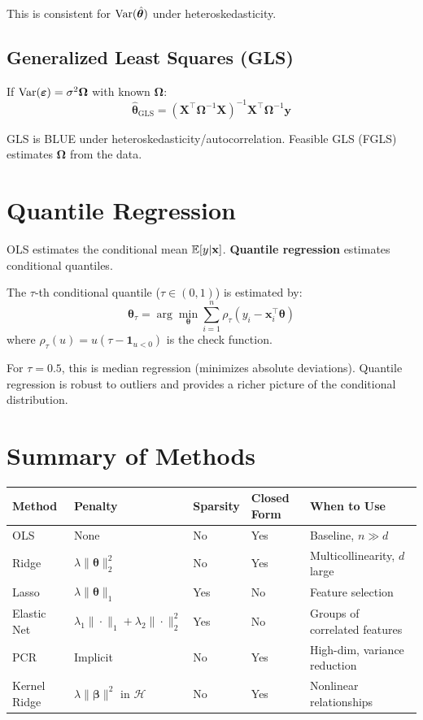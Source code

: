 \documentclass[main.tex]{subfiles}
\begin{document}
This is consistent for $\text{Var}(\hat{\boldsymbol{\theta}})$ under heteroskedasticity.

\subsection{Generalized Least Squares (GLS)}

If $\text{Var}(\boldsymbol{\varepsilon}) = \sigma^2\boldsymbol{\Omega}$ with known $\boldsymbol{\Omega}$:
$$\hat{\boldsymbol{\theta}}_{\text{GLS}} = (\mathbf{X}^\top\boldsymbol{\Omega}^{-1}\mathbf{X})^{-1}\mathbf{X}^\top\boldsymbol{\Omega}^{-1}\mathbf{y}$$

GLS is BLUE under heteroskedasticity/autocorrelation. Feasible GLS (FGLS) estimates $\boldsymbol{\Omega}$ from the data.

\needspace{0.33\textheight}
\section{Quantile Regression}

OLS estimates the conditional mean $\mathbb{E}[y|\mathbf{x}]$. \textbf{Quantile regression} estimates conditional quantiles.

\begin{definition}
The $\tau$-th conditional quantile ($\tau \in (0,1)$) is estimated by:
$$\hat{\boldsymbol{\theta}}_\tau = \arg\min_{\boldsymbol{\theta}} \sum_{i=1}^{n}\rho_\tau(y_i - \mathbf{x}_i^\top\boldsymbol{\theta})$$
where $\rho_\tau(u) = u(\tau - \mathbf{1}_{u < 0})$ is the check function.
\end{definition}

For $\tau = 0.5$, this is median regression (minimizes absolute deviations). Quantile regression is robust to outliers and provides a richer picture of the conditional distribution.

\needspace{0.33\textheight}
\section{Summary of Methods}

\begin{center}
\small
\begin{tabular}{lllll}
\hline
\textbf{Method} & \textbf{Penalty} & \textbf{Sparsity} & \textbf{Closed Form} & \textbf{When to Use} \\
\hline
OLS & None & No & Yes & Baseline, $n \gg d$ \\
Ridge & $\lambda\|\boldsymbol{\theta}\|_2^2$ & No & Yes & Multicollinearity, $d$ large \\
Lasso & $\lambda\|\boldsymbol{\theta}\|_1$ & Yes & No & Feature selection \\
Elastic Net & $\lambda_1\|\cdot\|_1 + \lambda_2\|\cdot\|_2^2$ & Yes & No & Groups of correlated features \\
PCR & Implicit & No & Yes & High-dim, variance reduction \\
Kernel Ridge & $\lambda\|\boldsymbol{\beta}\|^2$ in $\mathcal{H}$ & No & Yes & Nonlinear relationships \\
\hline
\end{tabular}
\end{center}
\end{document}
